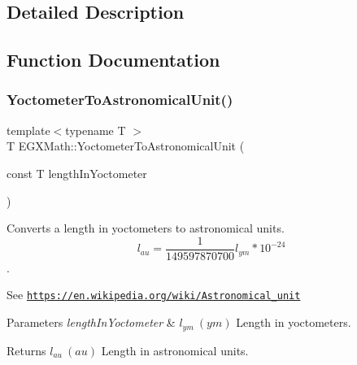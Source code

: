 \subsection{Detailed Description}


\subsection{Function Documentation}
\mbox{\label{group___e_g_x_math-_conversions-_length_conversions-_s_i-_yoctometer-_astronomical_ga6963327b8caa5f9a231197768126efc2}} 
\subsubsection{\texorpdfstring{Yoctometer\+To\+Astronomical\+Unit()}{YoctometerToAstronomicalUnit()}}
{\footnotesize\ttfamily template$<$typename T $>$ \\
T E\+G\+X\+Math\+::\+Yoctometer\+To\+Astronomical\+Unit (\begin{DoxyParamCaption}\item[{const T}]{length\+In\+Yoctometer }\end{DoxyParamCaption})}



Converts a length in yoctometers to astronomical units. \[ l_{au}= \frac{1}{149597870700} l_{ym} * 10^{-24} \]. 

See \href{https://en.wikipedia.org/wiki/Astronomical_unit}{\tt https\+://en.\+wikipedia.\+org/wiki/\+Astronomical\+\_\+unit} 
\begin{DoxyParams}{Parameters}
{\em length\+In\+Yoctometer} & $ l_{ym}\ (ym)$ Length in yoctometers. \\
\hline
\end{DoxyParams}
\begin{DoxyReturn}{Returns}
$ l_{au}\ (au)$ Length in astronomical units. 
\end{DoxyReturn}
\mbox{\label{group___e_g_x_math-_conversions-_length_conversions-_s_i-_yoctometer-_astronomical_gab1406f246c0472c4cef3ee0f5a6b1221}} 
